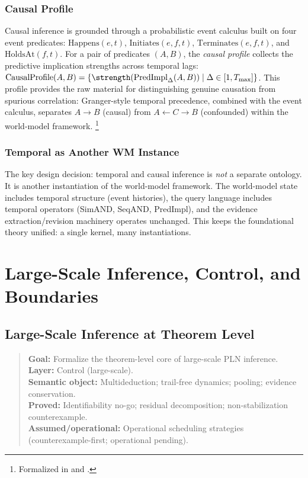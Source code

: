 \documentclass[11pt,openany]{report}
\begin{document}
\section{Causal Profile}

Causal inference is grounded through a probabilistic event calculus
built on four event predicates: $\mathrm{Happens}(e, t)$,
$\mathrm{Initiates}(e, f, t)$, $\mathrm{Terminates}(e, f, t)$, and
$\mathrm{HoldsAt}(f, t)$.  For a pair of predicates $(A, B)$, the
\emph{causal profile} collects the predictive implication strengths across
temporal lags:
$\mathrm{CausalProfile}(A, B) = \{\strength(\mathrm{PredImpl}_\Delta(A, B))
\mid \Delta \in [1, T_{\max}]\}$.  This profile provides the raw material
for distinguishing genuine causation from spurious correlation:
Granger-style temporal precedence, combined with the event calculus,
separates $A \to B$ (causal) from $A \leftarrow C \to B$ (confounded)
within the world-model framework.%
\footnote{Formalized in  and
  .}

\section{Temporal as Another WM Instance}

The key design decision: temporal and causal inference is \emph{not} a
separate ontology.  It is another instantiation of the world-model
framework.  The world-model state includes temporal structure (event
histories), the query language includes temporal operators (SimAND,
SeqAND, PredImpl), and the evidence extraction/revision machinery
operates unchanged.  This keeps the foundational theory unified:
a single kernel, many instantiations.


\part{Large-Scale Inference, Control, and Boundaries}
\label{part:large-scale}

\chapter{Large-Scale Inference at Theorem Level}
\label{ch:large-scale}

\begin{quote}\small
\textbf{Goal:} Formalize the theorem-level core of large-scale PLN inference.\\
\textbf{Layer:} Control (large-scale).\\
\textbf{Semantic object:} Multideduction; trail-free dynamics; pooling; evidence conservation.\\
\textbf{Proved:} Identifiability no-go; residual decomposition; non-stabilization counterexample.\\
\textbf{Assumed/operational:} Operational scheduling strategies (counterexample-first; operational pending).
\end{quote}
\end{document}
